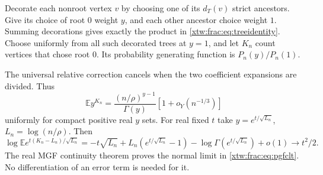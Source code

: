 \documentclass[11pt]{article}
\theoremstyle{remark}\newtheorem{remark}[theorem]{Remark}
\newcommand{\E}{\mathbb E}
\begin{document}
Decorate each nonroot vertex $v$ by choosing one of its $d_T(v)$ strict
ancestors. Give its choice of root $0$ weight $y$, and each other ancestor
choice weight $1$. Summing decorations gives exactly the product in
\eqref{xtw:frac:eq:treeidentity}. Choose uniformly from all such decorated trees at
$y=1$, and let $K_n$ count vertices that chose root $0$. Its probability
generating function is $P_n(y)/P_n(1)$.

The universal relative correction cancels when the two coefficient
expansions are divided. Thus
\begin{equation}\label{xtw:frac:eq:rowpgf}
 \E y^{K_n}=\frac{(n/\rho)^{y-1}}{\Gamma(y)}
                                      [1+o_Y(n^{-1/3})]
\end{equation}
uniformly for compact positive real $y$ sets. For real fixed $t$ take
$y=e^{t/\sqrt{L_n}}$, $L_n=\log(n/\rho)$. Then
\[
 \log\E e^{t(K_n-L_n)/\sqrt{L_n}}
 =-t\sqrt{L_n}+L_n(e^{t/\sqrt{L_n}}-1)
                         -\log\Gamma(e^{t/\sqrt{L_n}})+o(1)
 \longrightarrow t^2/2.
\]
The real MGF continuity theorem proves the normal limit in
\eqref{xtw:frac:eq:pgfclt}. No differentiation of an error term is needed for it.
\end{document}
